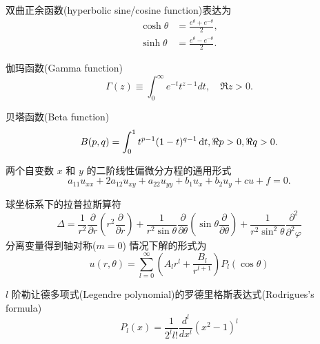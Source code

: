 \documentclass{njustexam}
\begin{document}
双曲正余函数(hyperbolic sine/cosine function)表达为
\begin{align*}
    \cosh \theta &= \frac{e^{\theta} + e^{ - \theta} }{2} ,
    \\
    \sinh \theta &= \frac{e^{\theta} - e^{ - \theta} }{2} .
\end{align*}

伽玛函数(Gamma function)
\begin{equation*}
  \Gamma(z) \equiv \int_{0}^{\infty} e^{-t} t^{z-1} d t, \quad \Re z>0 .
\end{equation*}

贝塔函数(Beta function)
\begin{equation*}
    B(p, q) = \int_0^1 t^{p -1} (1-t)^{q-1} \mathop{}\!\mathrm{d} t, \Re p> 0, \Re q >0.
    \label{eq:beta_def1}
\end{equation*}

两个自变数 $x$ 和 $y$ 的二阶线性偏微分方程的通用形式
\begin{equation*}
    a_{11} u_{x x}+2 a_{12} u_{x y}+a_{22} u_{y y}+b_1 u_x+b_2 u_y+c u+f=0.
    \label{eq:two_variable_diff_equation}
\end{equation*}

球坐标系下的拉普拉斯算符
\begin{equation*}
 \Delta = \frac{1}{r^2} \frac{\partial}{\partial r} \left( r^2 \frac{\partial }{\partial r} \right)
  + \frac{1}{r^2\sin \theta} \frac{\partial}{\partial \theta} \left( \sin\theta \frac{\partial}{\partial \theta} \right)
  + \frac{1}{r^2\sin^2 \theta} \frac{\partial^2}{\partial^2 \varphi}
\end{equation*}
分离变量得到轴对称($m=0$)
情况下解的形式为
\begin{equation*}
  u(r, \theta) = \sum_{l=0}^{\infty} \left( A_l r^l + \frac{B_l}{r^{l+1}} \right) P_{l} (\cos \theta)
\end{equation*}

$l$ 阶勒让德多项式(Legendre polynomial)的罗德里格斯表达式(Rodrigues's formula) 
$$P_l(x)=\frac{1}{2^l l !} \frac{d^l}{d x^l}\left(x^2-1\right)^l$$
\end{document}

